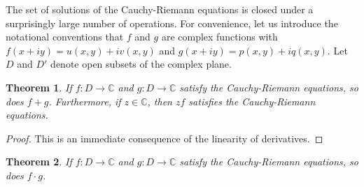 \documentclass[12pt]{article}
\newtheorem{thm}{Theorem}
\begin{document}
The set of solutions of the Cauchy-Riemann equations is closed under
a surprisingly large number of operations.  For convenience, let
us introduce the notational conventions that $f$ and $g$ are complex
functions with $f(x+iy) = u(x,y) + i v(x,y)$ and 
$g(x + iy) = p(x,y) + i q (x,y)$.  Let $D$  and $D'$ denote
open subsets of the complex plane.

\begin{thm}
If $f \colon D \to \mathbb{C}$ and 
$g \colon D \to \mathbb{C}$ 
satisfy the Cauchy-Riemann equations, so does $f + g$.  Furthermore, if $z\in \mathbb{C}$, then $zf$ satisfies the Cauchy-Riemann equations.
\end{thm}

\begin{proof}
This is an immediate consequence of the linearity of derivatives.
\end{proof}

\begin{thm}
If $f \colon D \to \mathbb{C}$ and 
$g \colon D \to \mathbb{C}$ satisfy the
Cauchy-Riemann equations, so does $f \cdot g$.
\end{thm}
\end{document}
